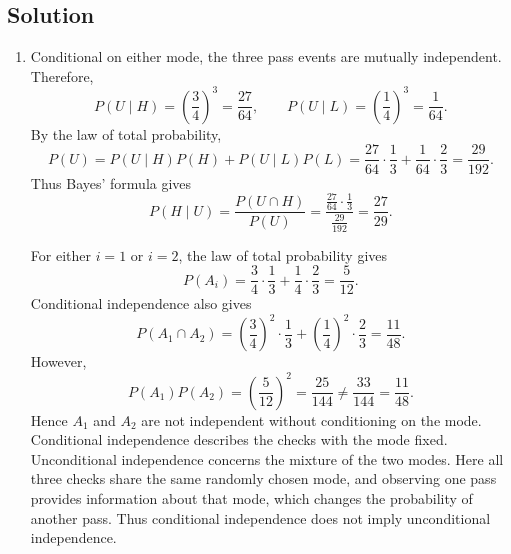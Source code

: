 \documentclass[11pt,a4paper]{article}
\newcommand{\Prob}{P}
\begin{document}
\subsection*{Solution}

\begin{enumerate}
\item Conditional on either mode, the three pass events are mutually
independent. Therefore,
\[
\Prob(U\mid H)=\left(\frac34\right)^3=\frac{27}{64},
\qquad
\Prob(U\mid L)=\left(\frac14\right)^3=\frac1{64}.
\]
By the law of total probability,
\[
\Prob(U)=\Prob(U\mid H)\Prob(H)+\Prob(U\mid L)\Prob(L)
=\frac{27}{64}\cdot\frac13+\frac1{64}\cdot\frac23
=\frac{29}{192}.
\]
Thus Bayes' formula gives
\[
\Prob(H\mid U)=\frac{\Prob(U\cap H)}{\Prob(U)}
=\frac{\frac{27}{64}\cdot\frac13}{\frac{29}{192}}
=\frac{27}{29}.
\]

For either $i=1$ or $i=2$, the law of total probability gives
\[
\Prob(A_i)=\frac34\cdot\frac13+\frac14\cdot\frac23=\frac5{12}.
\]
Conditional independence also gives
\[
\Prob(A_1\cap A_2)
=\left(\frac34\right)^2\cdot\frac13
 +\left(\frac14\right)^2\cdot\frac23
=\frac{11}{48}.
\]
However,
\[
\Prob(A_1)\Prob(A_2)=\left(\frac5{12}\right)^2
=\frac{25}{144}\ne\frac{33}{144}=\frac{11}{48}.
\]
Hence $A_1$ and $A_2$ are not independent without conditioning on the mode.
Conditional independence describes the checks with the mode fixed.
Unconditional independence concerns the mixture of the two modes.
Here all three checks share the same randomly chosen mode, and observing
one pass provides information about that mode, which changes the
probability of another pass. Thus conditional independence does not imply
unconditional independence.


\end{enumerate}
\end{document}
